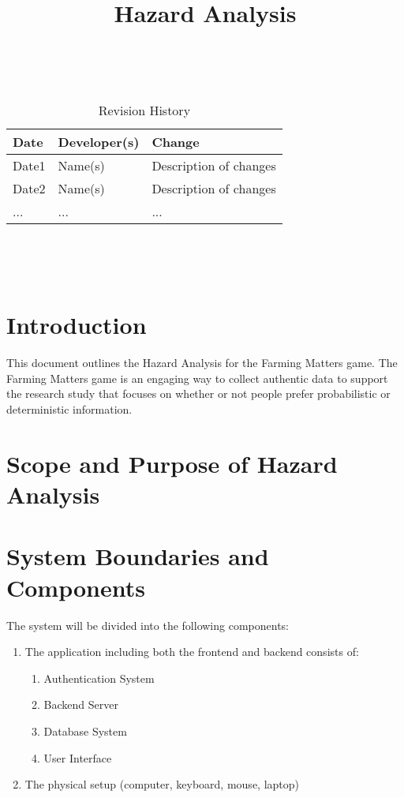 \documentclass{article}
\title{Hazard Analysis\\\progname}
\author{\authname}
\date{}
\begin{document}
\maketitle
\thispagestyle{empty}

~\newpage


\begin{table}[hp]
\caption{Revision History} \label{TblRevisionHistory}
\begin{tabularx}{\textwidth}{llX}
\toprule
\textbf{Date} & \textbf{Developer(s)} & \textbf{Change}\\
\midrule
Date1 & Name(s) & Description of changes\\
Date2 & Name(s) & Description of changes\\
... & ... & ...\\
\bottomrule
\end{tabularx}
\end{table}

~\newpage

\tableofcontents

~\newpage



\section{Introduction}
This document outlines the Hazard Analysis for the Farming Matters game. The Farming Matters game is an engaging way to collect authentic data to support the research study that focuses on whether or not people prefer probabilistic or deterministic information.


\section{Scope and Purpose of Hazard Analysis}

\section{System Boundaries and Components}
The system will be divided into the following components:

\begin{enumerate}
    \item The application including both the frontend and backend consists of:
    \begin{enumerate}
        \item Authentication System
        \item Backend Server
        \item Database System
        \item User Interface
    \end{enumerate}
    \item The physical setup (computer, keyboard, mouse, laptop)
\end{enumerate}
\end{document}
